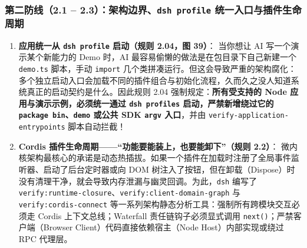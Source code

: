 \documentclass[a4paper]{article}
\begin{document}
\subsubsection{第二防线（2.1 -- 2.3）：架构边界、\texttt{dsh profile} 统一入口与插件生命周期}
\begin{enumerate}
    \item \textbf{应用统一从 \texttt{dsh profile} 启动（规则 2.04，图 39）}：
    当你想让 AI 写一个演示某个新能力的 Demo 时，AI 最容易偷懒的做法是在包目录下自己新建一个 \texttt{demo.ts} 脚本，手动 \texttt{import} 几个类拼凑运行。但这会导致严重的架构腐化：多个独立启动入口会加载不同的插件组合与初始化流程，久而久之没人知道系统真正的启动契约是什么。因此规则 2.04 强制规定：\textbf{所有受支持的 Node 应用与演示示例，必须统一通过 \texttt{dsh profiles} 启动，严禁新增绕过它的 \texttt{package bin}、\texttt{demo} 或公共 SDK \texttt{argv} 入口}，并由 {\footnotesize\texttt{verify-application-entrypoints}} 脚本自动拦截！
    \item \textbf{Cordis 插件生命周期——“功能要能装上，也要能卸下”（规则 2.2）}：
    微内核架构最核心的承诺是动态热插拔。如果一个插件在加载时注册了全局事件监听器、启动了后台定时器或向 DOM 树注入了按钮，但在卸载（Dispose）时没有清理干净，就会导致内存泄漏与幽灵回调。为此，\texttt{dsh} 编写了 \texttt{verify:runtime-closure}、\texttt{verify:client-domain-graph} 与 \texttt{verify:cordis-connect} 等一系列架构静态分析工具：强制所有跨模块交互必须走 Cordis 上下文总线；Waterfall 责任链钩子必须显式调用 \texttt{next()}；严禁客户端（Browser Client）代码直接依赖宿主（Node Host）内部实现或绕过 RPC 代理层。
\end{enumerate}
\end{document}
